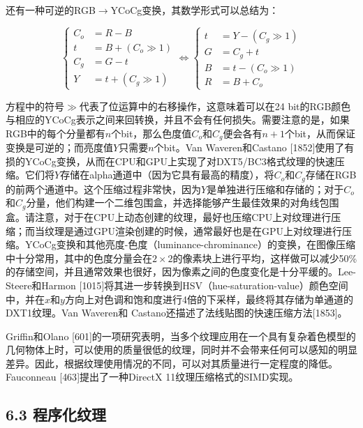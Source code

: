\documentclass[
  paper=a4,
  ,captions=tableheading
]{scrartcl}
\begin{document}
还有一种可逆的RGB\(\to\)YCoCg变换，其数学形式可以总结为：

\[
  \left\{\begin{aligned} C_{o} & =R-B \\ t & =B+\left(C_{o} \gg 1\right) \\ C_{g} & =G-t \\ Y & =t+\left(C_{g} \gg 1\right)\end{aligned} \Longleftrightarrow
  \left\{
  \begin{array}{rl}
    t & =Y-\left(C_{g} \gg 1\right) \\
    G & =C_{g}+t                    \\
    B & =t-\left(C_{o} \gg 1\right) \\
    R & =B+C_{o}
  \end{array}\right.
  \right.
  \tag{6.8}
\]

方程中的符号\(\gg\)代表了位运算中的右移操作，这意味着可以在24
bit的RGB颜色与相应的YCoCg表示之间来回转换，并且不会有任何损失。需要注意的是，如果RGB中的每个分量都有\(n\)个bit，那么色度值\(C_{o}\)和\(C_g\)便会各有\(n + 1\)个bit，从而保证变换是可逆的；而亮度值\(Y\)只需要\(n\)个bit。Van
Waveren和Castano
{[}1852{]}使用了有损的YCoCg变换，从而在CPU和GPU上实现了对DXT5/BC3格式纹理的快速压缩。它们将\(Y\)存储在alpha通道中（因为它具有最高的精度），将\(C_{o}\)和\(C_g\)存储在RGB的前两个通道中。这个压缩过程非常快，因为\(Y\)是单独进行压缩和存储的；对于\(C_{o}\)和\(C_g\)分量，他们构建一个二维包围盒，并选择能够产生最佳效果的对角线包围盒。请注意，对于在CPU上动态创建的纹理，最好也压缩CPU上对纹理进行压缩；而当纹理是通过GPU渲染创建的时候，通常最好也是在GPU上对纹理进行压缩。YCoCg变换和其他亮度-色度（luminance-chrominance）的变换，在图像压缩中十分常用，其中的色度分量会在\(2 \times 2\)的像素块上进行平均，这样做可以减少50\%的存储空间，并且通常效果也很好，因为像素之间的色度变化是十分平缓的。Lee-Steere和Harmon
{[}1015{]}将其进一步转换到HSV（hue-saturation-value）颜色空间中，并在\(x\)和\(y\)方向上对色调和饱和度进行4倍的下采样，最终将其存储为单通道的DXT1纹理。Van
Waveren和 Castano还描述了法线贴图的快速压缩方法{[}1853{]}。

Griffin和Olano
{[}601{]}的一项研究表明，当多个纹理应用在一个具有复杂着色模型的几何物体上时，可以使用的质量很低的纹理，同时并不会带来任何可以感知的明显差异。因此，根据纹理使用情况的不同，可以对其质量进行一定程度的降低。Fauconneau
{[}463{]}提出了一种DirectX 11纹理压缩格式的SIMD实现。

\subsection{6.3 程序化纹理}\label{ux7a0bux5e8fux5316ux7eb9ux7406}
\end{document}

